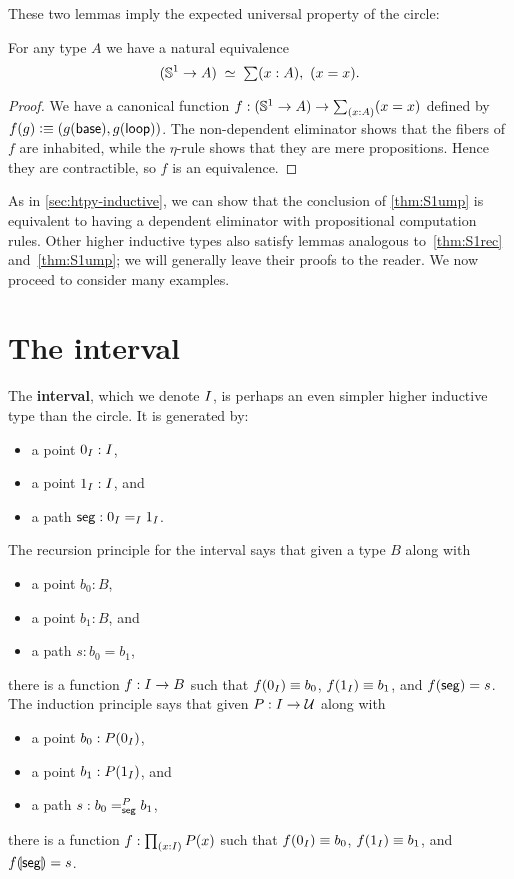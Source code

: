These two lemmas imply the expected universal property of the circle:

\begin{lem}\label{thm:S1ump}
  For any type $A$ we have a natural equivalence
  \[ (\Sn^1 \to A) \;\simeq\;
  \sm{x:A} (x=x).
  \]
\end{lem}
\begin{proof}
  We have a canonical function $f:(\Sn^1 \to A) \to \sm{x:A} (x=x)$ defined by $f(g) \defeq (g(\base),\ap g \lloop)$.
  The non-dependent eliminator shows that the fibers of $f$ are inhabited, while the $\eta$-rule shows that they are mere propositions.
  Hence they are contractible, so $f$ is an equivalence.
\end{proof}

As in \autoref{sec:htpy-inductive}, we can show that the conclusion of \autoref{thm:S1ump} is equivalent to having a dependent eliminator with propositional computation rules.
Other higher inductive types also satisfy lemmas analogous to~\ref{thm:S1rec} and~\ref{thm:S1ump}; we will generally leave their proofs to the reader.
We now proceed to consider many examples.


\section{The interval}
\label{sec:interval}

The \textbf{interval}, which we denote $\interval$, is perhaps an even simpler higher inductive type than the circle.
It is generated by:
\begin{itemize}
\item a point $\izero:\interval$,
\item a point $\ione:\interval$, and
\item a path $\seg : \id[\interval]\izero\ione$.
\end{itemize}
The recursion principle for the interval says that given a type $B$ along with
\begin{itemize}
\item a point $b_0:B$,
\item a point $b_1:B$, and
\item a path $s:b_0=b_1$,
\end{itemize}
there is a function $f:\interval\to B$ such that $f(\izero)\jdeq b_0$, $f(\ione)\jdeq b_1$, and $\ap f \seg = s$.
The induction principle says that given $P:\interval\to\type$ along with
\begin{itemize}
\item a point $b_0:P(\izero)$,
\item a point $b_1:P(\ione)$, and
\item a path $s:\dpath{P}{\seg}{b_0}{b_1}$,
\end{itemize}
there is a function $f:\prd{x:\interval} P(x)$ such that $f(\izero)\jdeq b_0$, $f(\ione)\jdeq b_1$, and $\apd f \seg = s$.

